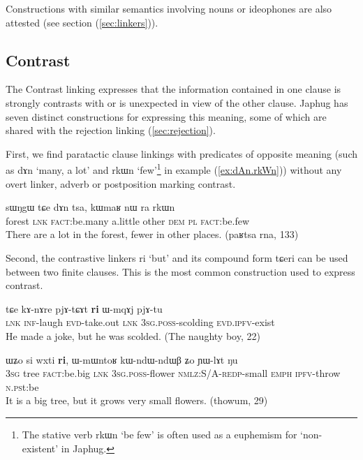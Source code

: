 \documentclass[oldfontcommands,oneside,a4paper,11pt]{article}
\newcommand{\ipa}[1]{{\phon \mbox{#1}}} %
\newcommand{\refb}[1]{(\ref{#1})}
\begin{document}
Constructions with similar semantics involving nouns or ideophones are also attested (see section \refb{sec:linkers}).
 
 
 
 
\subsection{Contrast} \label{sec:contrast}
The Contrast linking expresses that the information contained in one clause is strongly contrasts with or is unexpected in view of the other clause. Japhug has seven distinct constructions for expressing this meaning, some of which are shared with the rejection linking \refb{sec:rejection}.

First, we   find  paratactic clause linkings with predicates of opposite meaning (such as \ipa{dɤn} `many, a lot' and \ipa{rkɯn} `few'\footnote{The stative verb \ipa{rkɯn} `be few' is often used as a euphemism for `non-existent' in Japhug.} in example \refb{ex:dAn.rkWn}) without any overt linker, adverb or postposition marking contrast.  

\begin{exe}
\ex \label{ex:dAn.rkWn}
\gll
 \ipa{sɯŋgɯ}  	\ipa{tɕe}  	\ipa{dɤn}  	\ipa{tsa,}  	\ipa{kɯmaʁ}  	\ipa{nɯ} \ipa{ra}  	\ipa{rkɯn}  \\
 forest \textsc{lnk} \textsc{fact}:be.many a.little other \textsc{dem} \textsc{pl} \textsc{fact}:be.few \\
\glt There are a lot in the forest, fewer in other places. (paʁtsa rna, 133)
\end{exe}

Second, the contrastive linkers \ipa{ri} `but' and its compound form \ipa{tɕeri} can be used between two finite clauses. This is the most common construction used to express contrast.
\begin{exe}
\ex \label{ex:ndAre.mWjmWm}
\gll
\ipa{tɕe}  	\ipa{kɤ-nɤre}  	\ipa{pjɤ-tɕɤt}  	\ipa{\textbf{ri}}  	\ipa{ɯ-mqɤj}  	\ipa{pjɤ-tu}  \\
\textsc{lnk} \textsc{inf}-laugh \textsc{evd}-take.out \textsc{lnk} \textsc{3sg.poss}-scolding
\textsc{evd.ipfv}-exist\\
\glt He made a joke, but he was scolded. (The naughty boy, 22)
\end{exe}

\begin{exe}
\ex \label{ex:wxti.ri}
\gll
\ipa{ɯʑo}    	\ipa{si}    	\ipa{wxti}    	\ipa{\textbf{ri},}    	\ipa{ɯ-mɯntoʁ}    	\ipa{kɯ-ndɯ-ndɯβ}    	\ipa{ʑo}    	\ipa{ɲɯ-lɤt}    	\ipa{ŋu}    \\
\textsc{3sg} tree \textsc{fact:}be.big \textsc{lnk} \textsc{3sg.poss}-flower \textsc{nmlz}:S/A-\textsc{redp}-small \textsc{emph} \textsc{ipfv}-throw \textsc{n.ps}t:be\\
\glt It is a big tree, but it grows very small flowers. (thowum, 29)
\end{exe}
\end{document}
